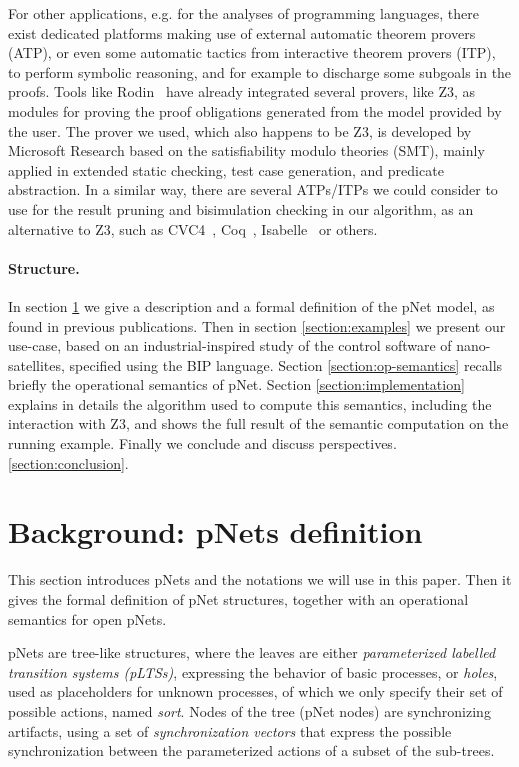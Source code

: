 \documentclass{lncs/llncs}
\begin{document}
For other applications, e.g. for the analyses of 
programming languages, there exist dedicated platforms making use of
external automatic theorem 
provers (ATP), or even some automatic tactics from interactive theorem
provers (ITP), to perform symbolic reasoning, and for example to
discharge some subgoals in the proofs.
Tools like Rodin~\cite{deharbe2013,deharbe2014,abrial2007} have
already integrated several provers, like Z3, as modules for proving
the proof obligations generated from the model provided by the user. 
The prover we used, which also happens to be Z3, is developed by Microsoft Research
based on the satisfiability modulo 
theories (SMT), mainly applied in extended static checking, test case
generation, and predicate abstraction.
In a similar way, there are several ATPs/ITPs we could consider to use for
the result pruning and bisimulation checking in our algorithm, as an
alternative to Z3, such as CVC4~\cite{barrett:CAV2011},
Coq~\cite{armand:CPP2011},
Isabelle~\cite{blanchette:FroCoS2011} or others. 


\paragraph{Structure.}
In section
\ref{section:pnets} we give a description and a formal definition of
the pNet model, as found in previous publications. Then in section
\ref{section:examples} we present our use-case, based on an
industrial-inspired study of the control software of nano-satellites,
specified using the BIP language. 
Section \ref{section:op-semantics} recalls briefly the operational semantics
of pNet.
Section \ref{section:implementation} explains in details the algorithm
used to compute this semantics, including the interaction with Z3, and
shows the full result of the semantic computation on the running example.
Finally we conclude and discuss perspectives.
\ref{section:conclusion}. 




\section{Background: pNets definition}
\label{section:pnets}

This section introduces pNets and the notations we will use in
this paper. Then it gives the formal definition of pNet structures,
together with an operational semantics for open pNets.

pNets are tree-like structures, where the leaves are either
\emph{parameterized labelled transition systems (pLTSs)}, expressing the
behavior of basic processes, or \emph{holes}, used as placeholders
for unknown processes, of which we only specify their set of possible
actions, named \emph{sort}.
Nodes of the tree (pNet nodes) are synchronizing artifacts, using a
set of \emph{synchronization vectors} that express the possible
synchronization between the parameterized actions of a subset of the
sub-trees.
\end{document}
